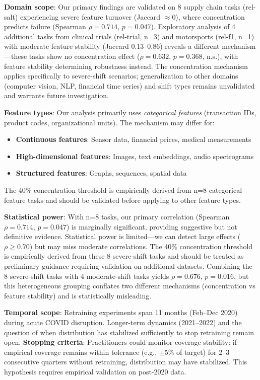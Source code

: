 \documentclass[sigconf]{acmart}
\begin{document}
\textbf{Domain scope}: Our primary findings are validated on 8 supply chain tasks (rel-salt) experiencing severe feature turnover (Jaccard $\approx$0), where concentration predicts failure (Spearman $\rho=0.714$, $p=0.047$). Exploratory analysis of 4 additional tasks from clinical trials (rel-trial, n=3) and motorsports (rel-f1, n=1) with moderate feature stability (Jaccard 0.13--0.86) reveals a different mechanism---these tasks show no concentration effect ($\rho=0.632$, $p=0.368$, n.s.), with feature stability determining robustness instead. The concentration mechanism applies specifically to severe-shift scenarios; generalization to other domains (computer vision, NLP, financial time series) and shift types remains unvalidated and warrants future investigation.

\textbf{Feature types}: Our analysis primarily uses \textit{categorical features} (transaction IDs, product codes, organizational units). The mechanism may differ for:
\begin{itemize}
    \item \textbf{Continuous features}: Sensor data, financial prices, medical measurements
    \item \textbf{High-dimensional features}: Images, text embeddings, audio spectrograms
    \item \textbf{Structured features}: Graphs, sequences, spatial data
\end{itemize}
The 40\% concentration threshold is empirically derived from n=8 categorical-feature tasks and should be validated before applying to other feature types.

\textbf{Statistical power}: With n=8 tasks, our primary correlation (Spearman $\rho=0.714$, $p=0.047$) is marginally significant, providing suggestive but not definitive evidence. Statistical power is limited---we can detect large effects ($\rho \geq 0.70$) but may miss moderate correlations. The 40\% concentration threshold is empirically derived from these 8 severe-shift tasks and should be treated as preliminary guidance requiring validation on additional datasets. Combining the 8 severe-shift tasks with 4 moderate-shift tasks yields $\rho=0.676$, $p=0.016$, but this heterogeneous grouping conflates two different mechanisms (concentration vs feature stability) and is statistically misleading.

\textbf{Temporal scope}: Retraining experiments span 11 months (Feb--Dec 2020) during acute COVID disruption. Longer-term dynamics (2021--2022) and the question of when distribution has stabilized sufficiently to stop retraining remain open. \textbf{Stopping criteria}: Practitioners could monitor coverage stability: if empirical coverage remains within tolerance (e.g., $\pm$5\% of target) for 2--3 consecutive quarters without retraining, distribution may have stabilized. This hypothesis requires empirical validation on post-2020 data.
\end{document}
